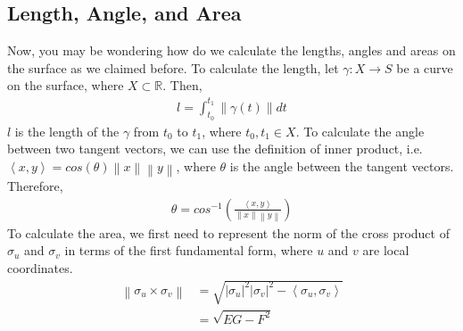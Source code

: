\documentclass{article}
\theoremstyle{plain}
\theoremstyle{definition}
\theoremstyle{remark}
\newcommand{\R}{\mathbb{R}}
\begin{document}
\subsection{Length, Angle, and Area}
Now, you may be wondering how do we calculate the lengths, angles and areas on the surface as we claimed before. To calculate the length, let \( \gamma: X \rightarrow S \) be a curve on the surface, where \(X \subset \R \). Then,
\begin{align*}
    l = \int_{t_0}^{t_1} \left\lVert \gamma(t)\right\rVert dt
\end{align*}
\(l\) is the length of the \(\gamma\) from \(t_0\) to \(t_1\), where \( t_0, t_1 \in X\).
To calculate the angle between two tangent vectors, we can use the definition of inner product, i.e. \( \left\langle x, y\right\rangle = cos(\theta) \left\lVert x \right\rVert \left\lVert y \right\rVert  \), where \(\theta\) is the angle between the tangent vectors. Therefore,
\begin{align*}
    \theta = cos^{-1} \left(  \frac{\left\langle x, y\right\rangle }{\left\lVert x \right\rVert \left\lVert y \right\rVert } \right)
\end{align*}
To calculate the area, we first need to represent the norm of the cross product of \( \sigma_u \) and \( \sigma_v \) in terms of the first fundamental form, where \( u \) and \( v\) are local coordinates.
\begin{align*}
    \left\lVert \sigma_u \times \sigma_v \right\rVert & = \sqrt{\left\lvert \sigma_u\right\rvert^2 \left\lvert \sigma_v \right\rvert^2 - \left\langle \sigma_u, \sigma_v \right\rangle } \\
                                                      & = \sqrt{EG - F^2}
\end{align*}
\end{document}
